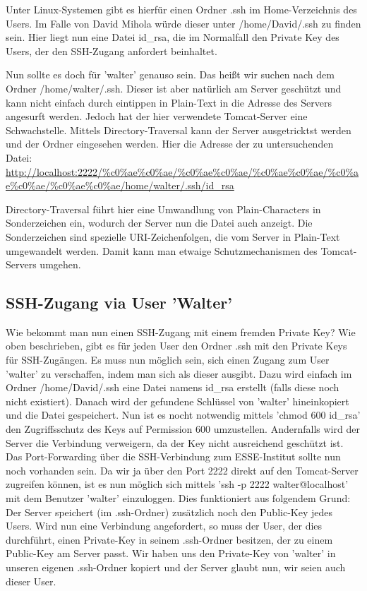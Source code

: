Unter Linux-Systemen gibt es hierfür einen Ordner .ssh im Home-Verzeichnis des Users. Im Falle von David Mihola würde
dieser unter /home/David/.ssh zu finden sein. Hier liegt nun eine Datei id\_rsa, die im Normalfall den Private Key
des Users, der den SSH-Zugang anfordert beinhaltet.

Nun sollte es doch für 'walter' genauso sein. Das heißt wir suchen nach dem Ordner /home/walter/.ssh. Dieser ist aber
natürlich am Server geschützt und kann nicht einfach durch eintippen in Plain-Text in die Adresse des Servers
angesurft werden. Jedoch hat der hier verwendete Tomcat-Server eine Schwachstelle. Mittels Directory-Traversal kann
der Server ausgetricktst werden und der Ordner eingesehen werden. Hier die Adresse der zu untersuchenden Datei:
\url{http://localhost:2222/%c0%ae%c0%ae/%c0%ae%c0%ae/%c0%ae%c0%ae/%c0%ae%c0%ae/%c0%ae%c0%ae/home/walter/.ssh/id\_rsa}

Directory-Traversal führt hier eine Umwandlung von Plain-Characters in Sonderzeichen ein, wodurch der Server nun die Datei auch
anzeigt. Die Sonderzeichen sind spezielle URI-Zeichenfolgen, die vom Server in Plain-Text umgewandelt werden. Damit kann
man etwaige Schutzmechanismen des Tomcat-Servers umgehen.

\subsection{SSH-Zugang via User 'Walter'}
Wie bekommt man nun einen SSH-Zugang mit einem fremden Private Key?
Wie oben beschrieben, gibt es für jeden User den Ordner .ssh mit den Private Keys für SSH-Zugängen. Es muss nun
möglich sein, sich einen Zugang zum User 'walter' zu verschaffen, indem man sich als dieser ausgibt. Dazu
wird einfach im Ordner /home/David/.ssh eine Datei namens id\_rsa erstellt (falls diese noch nicht existiert). Danach wird
der gefundene Schlüssel von 'walter' hineinkopiert und die Datei gespeichert. Nun ist es nocht notwendig mittels 'chmod
600 id\_rsa' den Zugriffsschutz des Keys auf Permission 600 umzustellen. Andernfalls wird der Server die Verbindung
verweigern, da der Key nicht ausreichend geschützt ist. Das Port-Forwarding über die SSH-Verbindung zum ESSE-Institut
sollte nun noch vorhanden sein. Da wir ja über den Port 2222 direkt auf den Tomcat-Server zugreifen können, ist es nun
möglich sich mittels 'ssh -p 2222 walter@localhost' mit dem Benutzer 'walter' einzuloggen. Dies funktioniert aus folgendem
Grund:\linebreak
Der Server speichert (im .ssh-Ordner) zusätzlich noch den Public-Key jedes Users. Wird nun eine Verbindung angefordert,
so muss der User, der dies durchführt, einen Private-Key in seinem .ssh-Ordner besitzen, der zu einem Public-Key am Server passt.
Wir haben uns den Private-Key von 'walter' in unseren eigenen .ssh-Ordner kopiert und der Server glaubt nun, wir seien
auch dieser User.

